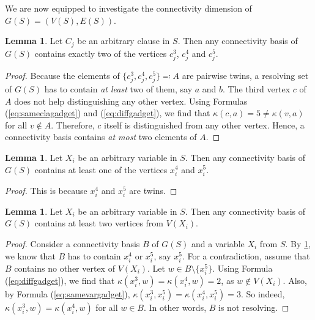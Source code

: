\documentclass[letterpaper,12pt,headings=normal,parskip=half]{scrartcl}
\theoremstyle{definition}
\newtheorem{lemma}[theorem]{Lemma}
\begin{document}
We are now equipped to investigate the connectivity dimension of $G(S)=(V(S),E(S))$.

\begin{lemma}\label{clauseexactly2}
    Let $C_j$ be an arbitrary clause in $S$. 
    Then any connectivity basis of $G(S)$ contains exactly two of the vertices $c_j^3$, $c_j^4$ and $c_j^5$.
\end{lemma}    

\begin{proof}
    Because the elements of $\{c_j^3,c_j^4,c_j^5\}\eqqcolon A$ are pairwise twins, a resolving set of $G(S)$ has to contain \emph{at least} two of them, say $a$ and $b$.
    The third vertex $c$ of $A$ does not help distinguishing any other vertex.
    Using  Formulas (\ref{eq:sameclagadget}) and (\ref{eq:diffgadget}), we find that $\kappa(c,a)=5\neq\kappa(v,a)$ for all $v\notin A$.
    Therefore, $c$ itself is distinguished from any other vertex.
    Hence, a connectivity basis contains \emph{at most} two elements of $A$.
\end{proof}

\begin{lemma}\label{variableatleast1}
    Let $X_i$ be an arbitrary variable in $S$. 
    Then any connectivity basis of $G(S)$ contains at least one of the vertices $x_i^4$ and $x_i^5$.
\end{lemma}

\begin{proof}
    This is because $x_i^4$ and $x_i^5$ are twins.
\end{proof}

\begin{lemma}\label{variableatleast2}
    Let $X_i$ be an arbitrary variable in $S$. 
    Then any connectivity basis of $G(S)$ contains at least two vertices from $V(X_i)$. 
\end{lemma}

\begin{proof}
    Consider a connectivity basis $B$ of $G(S)$ and a variable $X_i$ from $S$. 
    By \cref{variableatleast1}, we know that $B$ has to contain $x_i^4$ or $x_i^5$, say $x_i^5$. 
    For a contradiction, assume that $B$ contains no other vertex of $V(X_i)$.
    Let $w\in B\setminus \{x_i^5\}$. Using Formula (\ref{eq:diffgadget}), we find that $\kappa(x_i^3,w)=\kappa(x_i^4,w)=2$, as $w\notin V(X_i)$. Also, by Formula (\ref{eq:samevargadget}), $\kappa(x_i^3,x_i^5)=\kappa(x_i^4,x_i^5)=3$. So indeed, $\kappa(x_i^3,w)=\kappa(x_i^4,w)$ for all $w\in B$. 
    In other words, $B$ is not resolving.
\end{proof}
\end{document}
